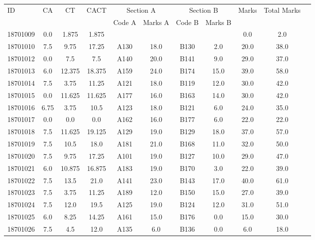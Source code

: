 \documentclass[12pt]{article}
\begin{document}
    \begin{center} 
	\renewcommand{\arraystretch}{1.08}
	\begin{small}
    \begin{tabular}{|l|c|c|c|c|c|c|c|c|c|c|} \hline
	\multirow{2}{*}{ID} & 	\multirow{2}{*}{CA}  & 	\multirow{2}{*}{CT}  & 	\multirow{2}{*}{CACT}  & \multicolumn{2 }{|c|}{Section A}& \multicolumn{2 }{c|}{Section B} & 	\multirow{2}{*}{Marks}  & 	\multirow{2}{*}{Total Marks}  \\ 
	&  &  &  & Code A & Marks A & Code B & Marks B&  &  \\ \hline
18701009 & 0.0 & 1.875 & 1.875 &  &  &  &  & 0.0 & 2.0\\ \hline 
18701010 & 7.5 & 9.75 & 17.25 & A130 & 18.0 & B130 & 2.0 & 20.0 & 38.0\\ \hline 
18701012 & 0.0 & 7.5 & 7.5 & A140 & 20.0 & B141 & 9.0 & 29.0 & 37.0\\ \hline 
18701013 & 6.0 & 12.375 & 18.375 & A159 & 24.0 & B174 & 15.0 & 39.0 & 58.0\\ \hline 
18701014 & 7.5 & 3.75 & 11.25 & A121 & 18.0 & B119 & 12.0 & 30.0 & 42.0\\ \hline 
18701015 & 0.0 & 11.625 & 11.625 & A177 & 16.0 & B163 & 14.0 & 30.0 & 42.0\\ \hline 
18701016 & 6.75 & 3.75 & 10.5 & A123 & 18.0 & B121 & 6.0 & 24.0 & 35.0\\ \hline 
18701017 & 0.0 & 0.0 & 0.0 & A162 & 16.0 & B177 & 6.0 & 22.0 & 22.0\\ \hline 
18701018 & 7.5 & 11.625 & 19.125 & A129 & 19.0 & B129 & 18.0 & 37.0 & 57.0\\ \hline 
18701019 & 7.5 & 10.5 & 18.0 & A181 & 21.0 & B168 & 11.0 & 32.0 & 50.0\\ \hline 
18701020 & 7.5 & 9.75 & 17.25 & A101 & 19.0 & B127 & 10.0 & 29.0 & 47.0\\ \hline 
18701021 & 6.0 & 10.875 & 16.875 & A183 & 19.0 & B170 & 3.0 & 22.0 & 39.0\\ \hline 
18701022 & 7.5 & 13.5 & 21.0 & A141 & 23.0 & B143 & 17.0 & 40.0 & 61.0\\ \hline 
18701023 & 7.5 & 3.75 & 11.25 & A189 & 12.0 & B150 & 15.0 & 27.0 & 39.0\\ \hline 
18701024 & 7.5 & 12.0 & 19.5 & A125 & 19.0 & B124 & 12.0 & 31.0 & 51.0\\ \hline 
18701025 & 6.0 & 8.25 & 14.25 & A161 & 15.0 & B176 & 0.0 & 15.0 & 30.0\\ \hline 
18701026 & 7.5 & 4.5 & 12.0 & A135 & 6.0 & B136 & 0.0 & 6.0 & 18.0\\ \hline 

\end{tabular}
\end{small}
\end{center}
\end{document}

